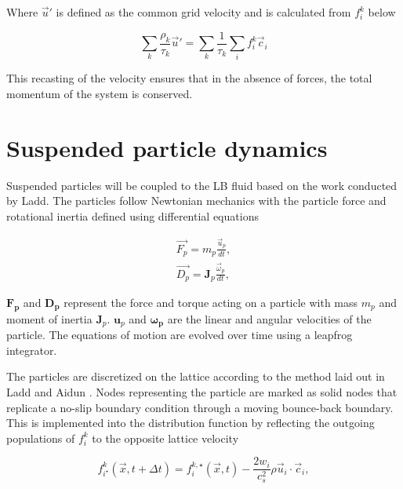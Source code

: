 Where $\vec{u}'$ is defined as the common grid velocity and is calculated from $f_i^k$ below

\begin{equation}
    \sum_k \frac{\rho_k}{\tau_k} \vec{u}' = \sum_k \frac{1}{\tau_k}\sum_i f_i^k\vec{c}_i
\end{equation}

This recasting of the velocity ensures that in the absence of forces, the total momentum of the system is conserved. 


\section{Suspended particle dynamics}
\label{section:lbm_colloids}

Suspended particles will be coupled to the LB fluid based on the work conducted by Ladd. \cite{ladd_numerical_1994, 
aidun_direct_1998, ladd_lattice-boltzmann_2001} The particles follow Newtonian mechanics with the particle force and
rotational inertia defined using differential equations

\begin{equation}
    \begin{split}
    \vec{F_p} = m_p \frac{\vec{u}_p}{dt} , \\
    \vec{D_p} = \mathbf{J}_p \frac{\vec{\omega}_p}{dt} ,
    \label{eq:md}
    \end{split}
\end{equation}

$\mathbf{F_p}$ and $\mathbf{D_p}$ represent the force and torque acting on a particle with mass $m_p$ and moment of inertia 
$\mathbf{J}_p$. $\mathbf{u}_p$ and $\mathbf{\omega_{p}}$ are the linear and angular velocities of the particle. The equations of 
motion are evolved over time using a leapfrog integrator. \cite{jansen_bijels_2011}

The particles are discretized on the lattice according to the method laid out in Ladd and Aidun 
\cite{ladd_lattice-boltzmann_2001}. Nodes representing the particle are marked as solid nodes that replicate
a no-slip boundary condition through a moving bounce-back boundary. This is implemented into the distribution function
by reflecting the outgoing populations of $f_i^k$ to the opposite lattice velocity

\begin{equation}
    f^k_{i^\star}(\vec{x}, t+\Delta t) = f^{k,\star}_i(\vec{x}, t) - \frac{2w_i}{c_s^2} \rho \vec{u}_i \cdot \vec{c}_i ,
\end{equation}

